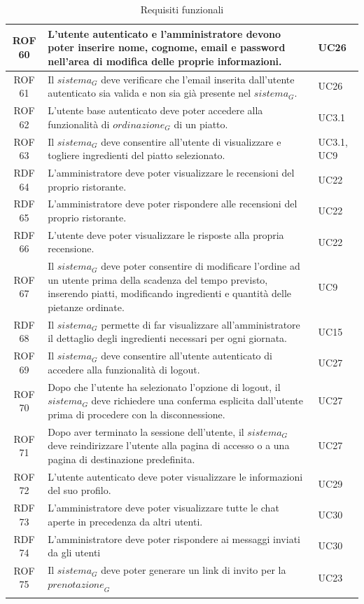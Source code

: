 \documentclass[12pt, oneside]{article}
\begin{document}
\begin{longtable}{|c|p{14cm}|p{2cm}|}
    ROF 60 & L'utente autenticato e l'amministratore devono poter inserire nome, cognome, email e password nell'area di modifica delle proprie informazioni.  & UC26  \\
    \hline
    ROF 61 & Il $\textit{sistema}_G$ deve verificare che l'email inserita dall'utente autenticato sia valida e non sia già presente nel $\textit{sistema}_G$.  & UC26  \\
    \hline
    ROF 62 & L'utente base autenticato deve poter accedere alla funzionalità di $\textit{ordinazione}_G$ di un piatto.  & UC3.1  \\
    \hline
    ROF 63 & Il $\textit{sistema}_G$ deve consentire all'utente di visualizzare e togliere ingredienti del piatto selezionato.  & UC3.1, UC9  \\
    \hline
    RDF 64 & L'amministratore deve poter visualizzare le recensioni del proprio ristorante. & UC22 \\ 
    \hline
    RDF 65 & L'amministratore deve poter rispondere alle recensioni del proprio ristorante. & UC22 \\
    \hline
    RDF 66 & L'utente deve poter visualizzare le risposte alla propria recensione. & UC22 \\
    \hline
    ROF 67 & Il $\textit{sistema}_G$ deve poter consentire di modificare l'ordine ad un utente prima della scadenza del tempo previsto, inserendo piatti, modificando ingredienti e quantità delle pietanze ordinate. & UC9 \\
    \hline
    RDF 68 & Il $\textit{sistema}_G$ permette di far visualizzare all'amministratore il dettaglio degli ingredienti necessari per ogni giornata. & UC15 \\
    \hline
    ROF 69 & Il $\textit{sistema}_G$ deve consentire all'utente autenticato di accedere alla funzionalità di logout. & UC27 \\
    \hline
    ROF 70 & Dopo che l'utente ha selezionato l'opzione di logout, il $\textit{sistema}_G$ deve richiedere una conferma esplicita dall'utente prima di procedere con la disconnessione. & UC27 \\ 
    \hline
    ROF 71 & Dopo aver terminato la sessione dell'utente, il $\textit{sistema}_G$ deve reindirizzare l'utente alla pagina di accesso o a una pagina di destinazione predefinita. & UC27 \\
    \hline
    ROF 72 & L'utente autenticato deve poter visualizzare le informazioni del suo profilo. & UC29 \\ 
    \hline

    RDF 73 & L'amministratore deve poter visualizzare tutte le chat aperte in precedenza da altri utenti. & UC30 \\
    \hline
    RDF 74 & L'amministratore deve poter rispondere ai messaggi inviati da gli utenti & UC30 \\
    \hline
    ROF 75 & Il $\textit{sistema}_G$ deve poter generare un link di invito per la $\textit{prenotazione}_G$ & UC23 \\
    \hline
\caption{Requisiti funzionali}
\end{longtable}
\end{document}
